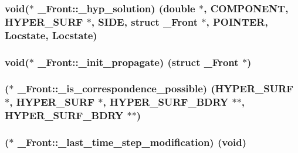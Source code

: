 \subsubsection[{\texorpdfstring{\+\_\+hyp\+\_\+solution}{_hyp_solution}}]{\setlength{\rightskip}{0pt plus 5cm}void($\ast$ \+\_\+\+Front\+::\+\_\+hyp\+\_\+solution) (double $\ast$, {\bf C\+O\+M\+P\+O\+N\+E\+NT}, {\bf H\+Y\+P\+E\+R\+\_\+\+S\+U\+RF} $\ast$, {\bf S\+I\+DE}, struct {\bf \+\_\+\+Front} $\ast$, {\bf P\+O\+I\+N\+T\+ER}, {\bf Locstate}, {\bf Locstate})}\hypertarget{struct___front_a231fe8f5cab41385bb4e61232b002a00}{}\label{struct___front_a231fe8f5cab41385bb4e61232b002a00}
\subsubsection[{\texorpdfstring{\+\_\+init\+\_\+propagate}{_init_propagate}}]{\setlength{\rightskip}{0pt plus 5cm}void($\ast$ \+\_\+\+Front\+::\+\_\+init\+\_\+propagate) (struct {\bf \+\_\+\+Front} $\ast$)}\hypertarget{struct___front_a036c95235b0744feb9c006baa5912c80}{}\label{struct___front_a036c95235b0744feb9c006baa5912c80}
\subsubsection[{\texorpdfstring{\+\_\+is\+\_\+correspondence\+\_\+possible}{_is_correspondence_possible}}]{($\ast$ \+\_\+\+Front\+::\+\_\+is\+\_\+correspondence\+\_\+possible) ({\bf H\+Y\+P\+E\+R\+\_\+\+S\+U\+RF} $\ast$, {\bf H\+Y\+P\+E\+R\+\_\+\+S\+U\+RF} $\ast$, {\bf H\+Y\+P\+E\+R\+\_\+\+S\+U\+R\+F\+\_\+\+B\+D\+RY} $\ast$$\ast$, {\bf H\+Y\+P\+E\+R\+\_\+\+S\+U\+R\+F\+\_\+\+B\+D\+RY} $\ast$$\ast$)}\hypertarget{struct___front_a37b2c3e796af8c3bd99b987507e0c1e9}{}\label{struct___front_a37b2c3e796af8c3bd99b987507e0c1e9}
\subsubsection[{\texorpdfstring{\+\_\+last\+\_\+time\+\_\+step\+\_\+modification}{_last_time_step_modification}}]{($\ast$ \+\_\+\+Front\+::\+\_\+last\+\_\+time\+\_\+step\+\_\+modification) (void)}\hypertarget{struct___front_a9426115e8c49d57ed24ec1f46ff3fb77}{}\label{struct___front_a9426115e8c49d57ed24ec1f46ff3fb77}
